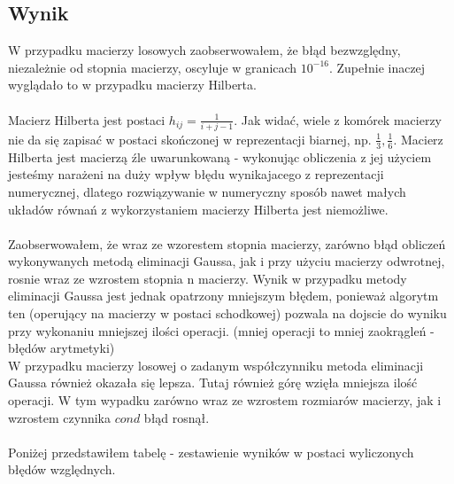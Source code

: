 \subsection{Wynik}
W przypadku macierzy losowych zaobserwowałem, że błąd bezwzględny, niezależnie od stopnia macierzy, oscyluje w granicach $ 10^{-16} $. Zupełnie inaczej wyglądało to w przypadku macierzy Hilberta. \\\\
Macierz Hilberta jest postaci $ h_{ij} = \frac{1}{i + j - 1}$. Jak widać, wiele z komórek macierzy nie da się zapisać w postaci skończonej w reprezentacji biarnej, np. $ \frac{1}{3}, \frac{1}{6} $. Macierz Hilberta jest macierzą źle uwarunkowaną - wykonując obliczenia z jej użyciem jesteśmy narażeni na duży wpływ błędu wynikajacego z reprezentacji numerycznej, dlatego rozwiązywanie w numeryczny sposób nawet małych układów równań z wykorzystaniem macierzy Hilberta jest niemożliwe. \\\\
Zaobserwowałem, że wraz ze wzorestem stopnia macierzy, zarówno błąd obliczeń wykonywanych metodą eliminacji Gaussa, jak i przy użyciu macierzy odwrotnej, rosnie wraz ze wzrostem stopnia n macierzy. Wynik w przypadku metody eliminacji Gaussa jest jednak opatrzony mniejszym błędem, ponieważ algorytm ten (operujący na macierzy w postaci schodkowej) pozwala na dojscie do wyniku przy wykonaniu mniejszej ilości operacji. (mniej operacji to mniej zaokrągleń - błędów arytmetyki)\\
W przypadku macierzy losowej o zadanym współczynniku metoda eliminacji Gaussa również okazała się lepsza. Tutaj również górę wzięła mniejsza ilość operacji. W tym wypadku zarówno wraz ze wzrostem rozmiarów macierzy, jak i wzrostem czynnika $ cond $ błąd rosnął. \\\\
Poniżej przedstawiłem tabelę - zestawienie wyników w postaci wyliczonych błędów względnych. \\
\begin{center}

\end{center}


